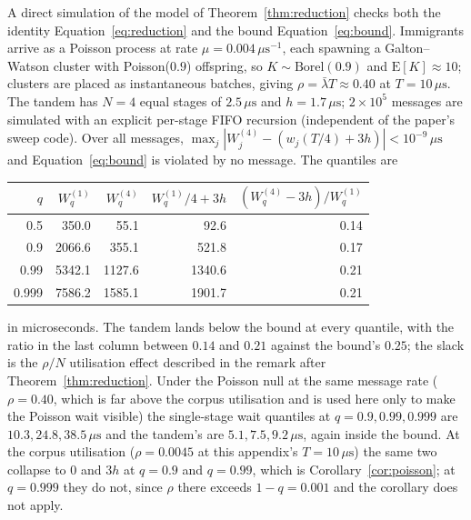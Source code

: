\documentclass[11pt]{article}
\begin{document}
A direct simulation of the model of Theorem~\ref{thm:reduction} checks both the identity
Equation~\eqref{eq:reduction} and the bound Equation~\eqref{eq:bound}. Immigrants arrive
as a Poisson process at rate $\mu = 0.004\,\mu\mathrm{s}^{-1}$, each spawning a
Galton--Watson cluster with Poisson($0.9$) offspring, so $K \sim \mathrm{Borel}(0.9)$ and
$\mathrm{E}[K] \approx 10$; clusters are placed as instantaneous batches, giving $\rho =
\bar\lambda T \approx 0.40$ at $T = 10\,\mu\mathrm{s}$. The tandem has $N = 4$ equal
stages of $2.5\,\mu\mathrm{s}$ and $h = 1.7\,\mu\mathrm{s}$; $2 \times 10^{5}$ messages
are simulated with an explicit per-stage FIFO recursion (independent of the paper's sweep code). Over all messages, $\max_j |W_j^{(4)} - (w_j(T/4) + 3h)| <
10^{-9}\,\mu\mathrm{s}$ and Equation~\eqref{eq:bound} is violated by no message. The
quantiles are

\begin{center}
\begin{tabular}{@{}rrrrr@{}}
\toprule
$q$ & $W_q^{(1)}$ & $W_q^{(4)}$ & $W_q^{(1)}/4 + 3h$ & $(W_q^{(4)} - 3h)/W_q^{(1)}$ \\
\midrule
0.5   & 350.0  & 55.1   & 92.6   & 0.14 \\
0.9   & 2066.6 & 355.1  & 521.8  & 0.17 \\
0.99  & 5342.1 & 1127.6 & 1340.6 & 0.21 \\
0.999 & 7586.2 & 1585.1 & 1901.7 & 0.21 \\
\bottomrule
\end{tabular}
\end{center}

in microseconds. The tandem lands below the bound at every quantile, with the ratio in the
last column between $0.14$ and $0.21$ against the bound's $0.25$; the slack is the
$\rho/N$ utilisation effect described in the remark after Theorem~\ref{thm:reduction}.
Under the Poisson null at the same message rate ($\rho = 0.40$, which is far above the
corpus utilisation and is used here only to make the Poisson wait visible) the
single-stage wait quantiles at $q = 0.9, 0.99, 0.999$ are $10.3, 24.8,
38.5\,\mu\mathrm{s}$ and the tandem's are $5.1, 7.5, 9.2\,\mu\mathrm{s}$, again inside the
bound. At the corpus utilisation ($\rho = 0.0045$ at this appendix's $T =
10\,\mu\mathrm{s}$) the same two collapse to $0$ and $3h$ at $q = 0.9$ and $q = 0.99$,
which is Corollary~\ref{cor:poisson}; at $q = 0.999$ they do not, since $\rho$ there
exceeds $1 - q = 0.001$ and the corollary does not apply.
\end{document}
